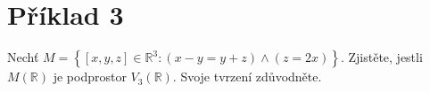 \section*{Příklad 3}
Nechť $M = \left\{[x, y, z] \in \mathbb{R}^3: (x - y = y + z) \wedge (z = 2x)\right\}$.
Zjistěte, jestli $ M(\mathbb{R})$ je podprostor $ V_3(\mathbb{R})$.
Svoje tvrzení zdůvodněte.
